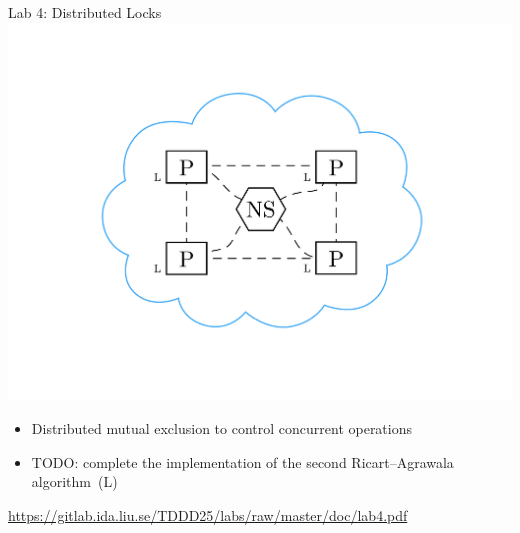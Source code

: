 \documentclass[compress,xcolor=table]{beamer}
\begin{document}
\begin{frame}{Lab 4: Distributed Locks}
  \centering
  \includegraphics[scale=0.10,page=1]{include/assets/lock}
  \begin{itemize}
    \item Distributed mutual exclusion to control concurrent operations
    \item \alert{TODO}: complete the implementation of the second
    Ricart--Agrawala algorithm~(L)
  \end{itemize}
  \begin{center}
    \scriptsize \url{https://gitlab.ida.liu.se/TDDD25/labs/raw/master/doc/lab4.pdf}
  \end{center}
\end{frame}
\end{document}
